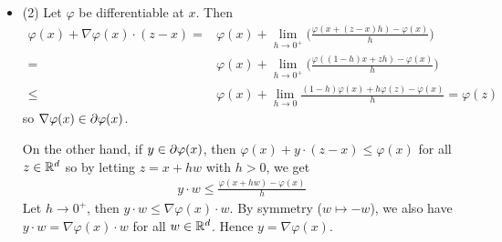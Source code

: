 \documentclass[12pt,a4paper]{article}
\newenvironment{proof}
{\begin{changemargin}{1cm}{0.5cm} 
	}%
	{\end{changemargin}
}
\renewenvironment{i}
{\begin{itemize} 
	}%
	{\end{itemize}
}
\newenvironment{p}
{\begin{proof} 
	}%
	{\end{proof}
}
\begin{document}
\begin{p}
\begin{i}
(b) We show $\varphi$ is Lipschitz continuous on $B(x, \delta^*/2\sqrt{d})$. Let $x_1, x_2 \in B(x, \delta^*/2\sqrt{d})$ where $x_1 \neq x_2$. Take $x_3$ to be the intersectin of the line throgh $x_1$ and $x_2$ with $\pa B(x, \delta^*/\sqrt{d})$ and choose $x_3$ such that $x_2$ lies between $x_1$ and $x_3$. Define $\lambda = \frac{|x_2 - x_3|}{|x_1 -x_3|} \in (0,1)$. Now,
\begin{align*}
\lambda x_1 + (1- \lambda) x_3 =& \lambda x_2 + \lambda( x_1 - x_2) + (1- \lambda )x_2 + (1- \lambda)(x_3 - x_2) \\
=& x_2 + \frac{|x_2 -x_3|}{|x_1 -x_3|} (x_1 -x_2) + \frac{|x_1- x_3| - |x_2 -x_3|}{|x_2 - x_3|}(x_3 -x_2) \\
=& x_2 + \frac{1}{|x_1-x_3|} \big( |x_2 - x_3| (x_1-x_2) + |x_1 - x_2|(x_3 -x_2) \big) \\
=& x_2
\end{align*}
By convexity of $\varphi$,
\begin{align*}
\varphi(x_2) & \leq (1- \lambda) \varphi(x_3) + \lambda \varphi(x_1) \\
\Rightarrow \quad  \varphi(x_2) - \varphi(x_1) &\leq (1- \lambda)(\varphi(x_3) - \varphi(x_1)) = \frac{|x_1 -x_2|}{|x_1 -x_3|}(\varphi(x_3) - \varphi(x_1)) \\
& \leq \frac{2\sqrt{d}\times 2M}{\delta^*}|x_1 -x_2| = L|x_1 -x_2|
\end{align*}
with $L = 4\sqrt{d}M/ \delta^*$. So $\varphi$ is Lipschitz. \emph{[This proof looks very complicated but the idea is very simple!]}

\item[(2)] Let $\varphi$ be differentiable at $x$. Then
\begin{align*}
\varphi(x) + \nabla \varphi(x) \cdot (z-x) =& \varphi(x) + \lim_{h\rightarrow 0^+} \Big( \frac{\varphi(x + (z-x)h) - \varphi (x)}{h} \Big) \\
=& \varphi(x) + \lim_{h\rightarrow 0^+} \Big( \frac{\varphi((1-h)x + zh) - \varphi (x)}{h} \Big) \\
\leq & \varphi(x) + \lim_{h\rightarrow 0} \frac{(1-h)\varphi(x) + h\varphi(z) - \varphi(x)}{h} =\varphi(z) 
\end{align*}
so $\nabla \varphi(x) \in \partial \varphi(x)$.

\quad On the other hand, if $y\in \partial \varphi(x)$, then $\varphi(x) + y\cdot(z-x) \leq \varphi(x)$ for all $z\in \mathbb{R}^d$ so by letting $z= x+ hw$ with $h>0$, we get
\begin{align*}
y\cdot w \leq \frac{\varphi(x+ hw) - \varphi(x)}{h}
\end{align*}
Let $h\rightarrow 0^+$, then $y\cdot w \leq \nabla \varphi(x) \cdot w$. By symmetry ($w\mapsto -w$), we also have $y\cdot w = \nabla \varphi(x) \cdot w$ for all $w\in \mathbb{R}^d$. Hence $y= \nabla \varphi(x)$.
\end{i}
\eop
\end{p}
\s
\end{document}
